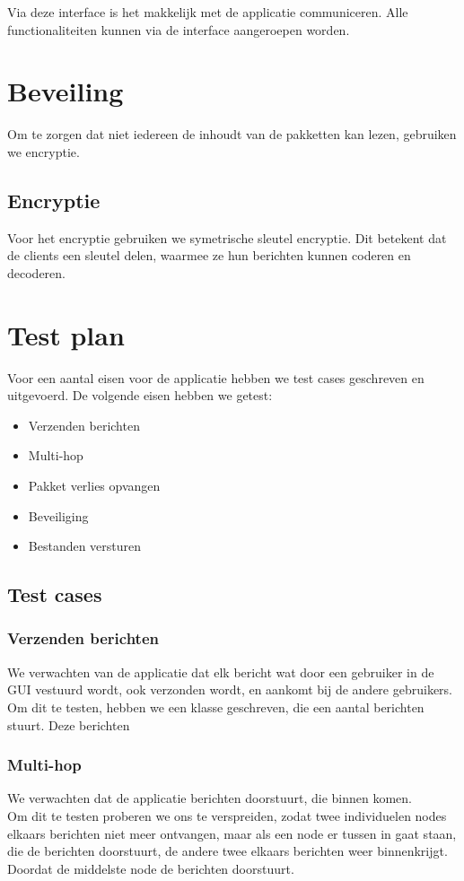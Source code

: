 \documentclass{article}
\begin{document}
Via deze interface is het makkelijk met de applicatie communiceren. Alle functionaliteiten kunnen via de interface aangeroepen worden. 

\section{Beveiling}
Om te zorgen dat niet iedereen de inhoudt van de pakketten kan lezen, gebruiken we encryptie. 

\subsection{Encryptie}
Voor het encryptie gebruiken we symetrische sleutel encryptie. Dit betekent dat de clients een sleutel delen, waarmee ze hun berichten kunnen coderen en decoderen. 

\section{Test plan}
Voor een aantal eisen voor de applicatie hebben we test cases geschreven en uitgevoerd. De volgende eisen hebben we getest:
\begin{itemize}
\item Verzenden berichten
\item Multi-hop
\item Pakket verlies opvangen
\item Beveiliging
\item Bestanden versturen
\end{itemize}

\subsection{Test cases}
\subsubsection{Verzenden berichten}
We verwachten van de applicatie dat elk bericht wat door een gebruiker in de GUI vestuurd wordt, ook verzonden wordt, en aankomt bij de andere gebruikers. \\
Om dit te testen, hebben we een klasse geschreven, die een aantal berichten stuurt. Deze berichten 
\subsubsection{Multi-hop}
We verwachten dat de applicatie berichten doorstuurt, die binnen komen. \\
Om dit te testen proberen we ons te verspreiden, zodat twee individuelen nodes elkaars berichten niet meer ontvangen, maar als een node er tussen in gaat staan, die de berichten doorstuurt, de andere twee elkaars berichten weer binnenkrijgt. Doordat de middelste node de berichten doorstuurt. \\
\end{document}
